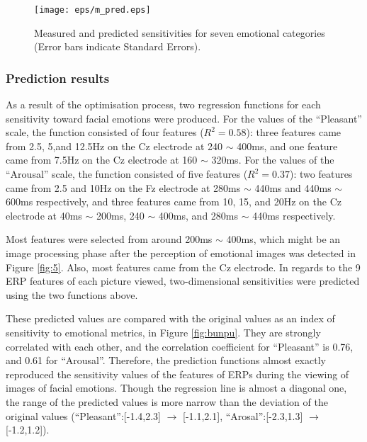 \documentclass[fonts]{icst}
\begin{document}
\begin{figure}[tb]
   \begin{center}
    \texttt{[image: eps/m\_pred.eps]}
   \end{center}
  \caption{Measured and predicted sensitivities for seven emotional
 categories (Error bars indicate Standard Errors).}
  \label{fig:emotion_est}
\end{figure}


\subsubsection{Prediction results}

As a result of the optimisation process, two regression functions for
each sensitivity toward facial emotions were produced. 
For the values of the ``Pleasant'' scale, the function consisted of four
features ($R^2=0.58$): three features came from 2.5, 5,and 12.5Hz on the
Cz electrode at 240 $\sim$ 400ms, and one feature came from 7.5Hz on the
Cz electrode at 160 $\sim$ 320ms. 
For the values of the ``Arousal'' scale, the function consisted of five
features ($R^2=0.37$): two features came from 2.5 and 10Hz on the Fz
electrode at 280ms $\sim$ 440ms and 440ms $\sim$ 600ms respectively, and
three features came from 10, 15, and 20Hz on the Cz electrode at 40ms
$\sim$ 200ms, 240 $\sim$ 400ms, and 280ms $\sim$ 440ms respectively. 

Most features were selected from around 200ms $\sim$ 400ms, which might
be an image processing phase after the perception of emotional images was
detected in Figure \ref{fig:5}. Also, most features came from the Cz
electrode. In regards to the 9 ERP features of each picture viewed, 
two-dimensional sensitivities were predicted using the two functions
above.  

These predicted values are compared with the original values as an index
of sensitivity to emotional metrics, in Figure \ref{fig:bunpu}. 
They are strongly correlated with each other, and the correlation coefficient 
for ``Pleasant'' is 0.76, and 0.61 for ``Arousal''. 
Therefore, the prediction functions almost exactly reproduced
the sensitivity values of the features of ERPs during the viewing of
images of facial emotions. 
Though the regression line is almost a diagonal one, the range of the 
predicted values is more narrow than the deviation of the original values
(``Pleasant'':[-1.4,2.3] $\to$ [-1.1,2.1], ``Arosal'':[-2.3,1.3] $\to$
[-1.2,1.2]).  
 
\end{document}

